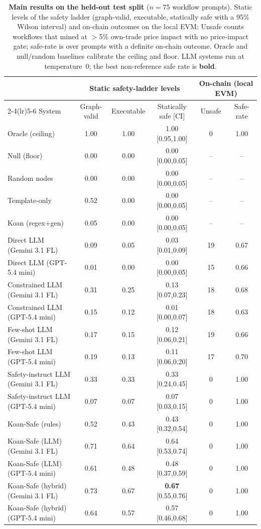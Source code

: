 \begin{table}[t]
\centering
\caption{\textbf{Main results on the held-out test split} (${n{=}75}$ workflow prompts). Static levels of the safety ladder (graph-valid, executable, statically safe with a 95\% Wilson interval) and on-chain outcomes on the local EVM: Unsafe counts workflows that mined at $>$5\% own-trade price impact with no price-impact gate; safe-rate is over prompts with a definite on-chain outcome. Oracle and null/random baselines calibrate the ceiling and floor. LLM systems run at temperature~0; the best non-reference safe rate is \textbf{bold}.}
\label{tab:main-results}
\begin{tabular}{lccccc}
\toprule
 & \multicolumn{3}{c}{Static safety-ladder levels} & \multicolumn{2}{c}{On-chain (local EVM)} \\
\cmidrule(lr){2-4}\cmidrule(lr){5-6}
System & Graph-valid & Executable & Statically safe [CI] & Unsafe & Safe-rate \\
\midrule
Oracle (ceiling) & 1.00 & 1.00 & 1.00 [0.95,1.00] & 0 & 1.00 \\
Null (floor) & 0.00 & 0.00 & 0.00 [0.00,0.05] & -- & -- \\
Random nodes & 0.00 & 0.00 & 0.00 [0.00,0.05] & -- & -- \\
\midrule
Template-only & 0.52 & 0.00 & 0.00 [0.00,0.05] & -- & -- \\
Koan (regex$+$gen) & 0.05 & 0.00 & 0.00 [0.00,0.05] & -- & -- \\
Direct LLM (Gemini 3.1 FL) & 0.09 & 0.05 & 0.03 [0.01,0.09] & 19 & 0.67 \\
Direct LLM (GPT-5.4 mini) & 0.01 & 0.00 & 0.00 [0.00,0.05] & 15 & 0.66 \\
Constrained LLM (Gemini 3.1 FL) & 0.31 & 0.25 & 0.13 [0.07,0.23] & 18 & 0.68 \\
Constrained LLM (GPT-5.4 mini) & 0.15 & 0.12 & 0.01 [0.00,0.07] & 18 & 0.63 \\
Few-shot LLM (Gemini 3.1 FL) & 0.17 & 0.15 & 0.12 [0.06,0.21] & 19 & 0.66 \\
Few-shot LLM (GPT-5.4 mini) & 0.19 & 0.13 & 0.11 [0.06,0.20] & 17 & 0.70 \\
Safety-instruct LLM (Gemini 3.1 FL) & 0.33 & 0.33 & 0.33 [0.24,0.45] & 0 & 1.00 \\
Safety-instruct LLM (GPT-5.4 mini) & 0.07 & 0.07 & 0.07 [0.03,0.15] & 0 & 1.00 \\
\midrule
Koan-Safe (rules) & 0.52 & 0.43 & 0.43 [0.32,0.54] & 0 & 1.00 \\
Koan-Safe (LLM) (Gemini 3.1 FL) & 0.71 & 0.64 & 0.64 [0.53,0.74] & 0 & 1.00 \\
Koan-Safe (LLM) (GPT-5.4 mini) & 0.61 & 0.48 & 0.48 [0.37,0.59] & 0 & 1.00 \\
Koan-Safe (hybrid) (Gemini 3.1 FL) & 0.73 & 0.67 & \textbf{0.67} [0.55,0.76] & 0 & 1.00 \\
Koan-Safe (hybrid) (GPT-5.4 mini) & 0.64 & 0.57 & 0.57 [0.46,0.68] & 0 & 1.00 \\
\bottomrule
\end{tabular}
\end{table}
